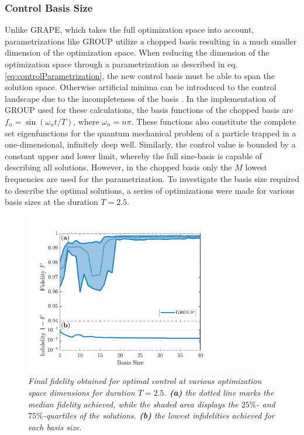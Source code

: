 \subsubsection{Control Basis Size}
Unlike GRAPE, which takes the full optimization space into account, parametrizations like GROUP utilize a chopped basis resulting in a much smaller dimension of the optimization space. When reducing the dimension of the optimization space through a parametrization as described in eq. \eqref{eq:controlParametrization}, the new control basis must be able to span the solution space. Otherwise artificial minima can be introduced to the control landscape due to the incompleteness of the basis \cite{Rach2015}. 
In the implementation of GROUP used for these calculations, the basis functions of the chopped basis are $f_n = \sin \left( \omega_n t / T \right)$, where $\omega_n = n \pi$. These functions also constitute the complete set eigenfunctions for the quantum mechanical problem of a particle trapped in a one-dimensional, infinitely deep well. Similarly, the control value is bounded by a constant upper and lower limit, whereby the full sine-basis is capable of describing all solutions. However, in the chopped basis only the $M$ lowest frequencies are used for the parametrization.
To investigate the basis size required to describe the optimal solutions, a series of optimizations were made for various basis sizes at the duration $T = 2.5$. 
\begin{figure}[h!]
    \centering
    \includegraphics[width=0.8\textwidth]{Figures/5part/BestFidelityBasisSize.pdf}
    \caption{\textit{Final fidelity obtained for optimal control at various optimization space dimensions for duration $T = 2.5$. \textbf{(a)} the dotted line marks the median fidelity achieved, while the shaded area displays the $25\%$- and $75\%$-quartiles of the solutions. \textbf{(b)} the lowest infidelities achieved for each basis size.}}
    \label{fig:FidelityBasisSize5}
\end{figure}
